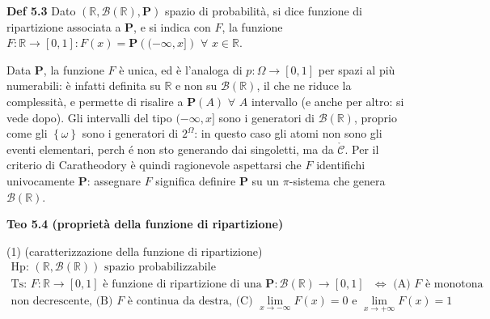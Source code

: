 \documentclass{article}
\begin{document}
\textbf{Def 5.3} Dato $\left( 
\mathbb{R}
,\mathcal{B}\left( 
\mathbb{R}
\right) ,\mathbf{P}\right) $ spazio di probabilit\`{a}, si dice funzione di
ripartizione associata a $\mathbf{P}$, e si indica con $F$, la funzione $F:%
\mathbb{R}
\rightarrow \left[ 0,1\right] :F\left( x\right) =\mathbf{P}\left( (-\infty
,x]\right) $ $\forall $ $x\in 
\mathbb{R}
$.

Data $\mathbf{P}$, la funzione $F$ \`{e} unica, ed \`{e} l'analoga di $%
p:\Omega \rightarrow \left[ 0,1\right] $ per spazi al pi\`{u} numerabili: 
\`{e} infatti definita su $%
\mathbb{R}
$ e non su $\mathcal{B}\left( 
\mathbb{R}
\right) $, il che ne riduce la complessit\`{a}, e permette di risalire a $%
\mathbf{P}\left( A\right) $ $\forall $ $A$ intervallo (e anche per altro: si
vede dopo). Gli intervalli del tipo $(-\infty ,x]$ sono i generatori di $%
\mathcal{B}\left( 
\mathbb{R}
\right) $, proprio come gli $\left\{ \omega \right\} $ sono i generatori di $%
2^{\Omega }$: in questo caso gli atomi non sono gli eventi elementari, perch%
\'{e} non sto generando dai singoletti, ma da $\mathcal{\mathring{C}}$. Per
il criterio di Caratheodory \`{e} quindi ragionevole aspettarsi che $F$
identifichi univocamente $\mathbf{P}$: assegnare $F$ significa definire $%
\mathbf{P}$ su un $\pi $-sistema che genera $\mathcal{B}\left( 
\mathbb{R}
\right) $.

\textbf{Teo 5.4 (propriet\`{a} della funzione di ripartizione)}

(1) (caratterizzazione della funzione di ripartizione)
\begin{gather*}
\text{Hp: }\left( 
\mathbb{R}
,\mathcal{B}\left( 
\mathbb{R}
\right) \right) \text{ spazio probabilizzabile} \\
\text{Ts: }F:%
\mathbb{R}
\rightarrow \left[ 0,1\right] \text{ \`{e} funzione di ripartizione di una }%
\mathbf{P}:\mathcal{B}\left( 
\mathbb{R}
\right) \rightarrow \left[ 0,1\right] \text{ }\Longleftrightarrow \text{ (A) 
}F\text{ \`{e} monotona} \\
\text{non decrescente, (B) }F\text{ \`{e} continua da destra, (C) }%
\lim_{x\rightarrow -\infty }F\left( x\right) =0\text{ e }\lim_{x\rightarrow
+\infty }F\left( x\right) =1
\end{gather*}
\end{document}
